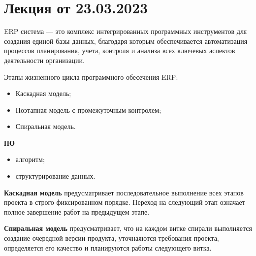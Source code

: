 
\section{Лекция от 23.03.2023}

ERP система --- это комплекс интегрированных программных инструментов для
создания единой базы данных, благодаря которым обеспечивается автоматизация
процессов планирования, учета, контроля и анализа всех ключевых аспектов
деятельности организации.

Этапы жизненного цикла программного обесечения ERP:
\begin{itemize}
  \item Каскадная модель;
  \item Поэтапная модель с промежуточным контролем;
  \item Спиральная модель.
\end{itemize}

\textbf{ПО}
\begin{itemize}
  \item алгоритм;
  \item структурирование данных.
\end{itemize}

\textbf{Каскадная модель} предусматривает последовательное выполнение всех
этапов проекта в строго фиксированном порядке. Переход на следующий этап
означает полное завершение работ на предыдущем этапе.\par

\textbf{Спиральная модель} предусматривает, что на каждом витке спирали
выполняется создание очередной версии продукта, уточнаяются требования проекта,
определяется его качество и планируются работы следующего витка.

